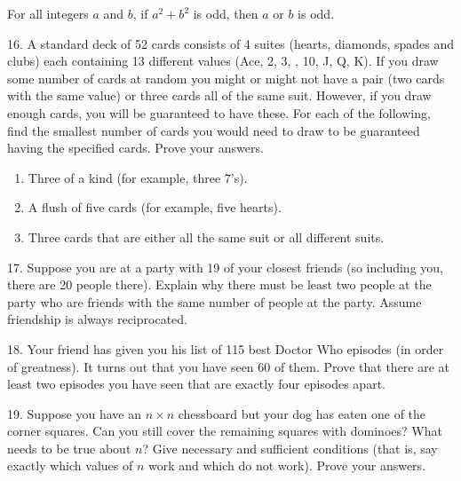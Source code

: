 \documentclass[12pt,]{book}
\theoremstyle{plain}
\theoremstyle{definition}
\theoremstyle{definition}
\theoremstyle{definition}
\numberwithin{equation}{chapter}
\begin{document}
\begin{exerciselist}
\begin{enumerate}[label=(\alph*)]
For all integers \(a\) and \(b\), if \(a^2 + b^2\) is odd, then \(a\) or \(b\) is odd.%
\end{enumerate}
%
\par\smallskip
\item[16.]\hypertarget{exercise-172}{}\hypertarget{p-1482}{}%
A standard deck of 52 cards consists of 4 suites (hearts, diamonds, spades and clubs) each containing 13 different values (Ace, 2, 3, \textellipsis{}, 10, J, Q, K). If you draw some number of cards at random you might or might not have a pair (two cards with the same value) or three cards all of the same suit. However, if you draw enough cards, you will be guaranteed to have these. For each of the following, find the smallest number of cards you would need to draw to be guaranteed having the specified cards. Prove your answers.%
\par
\hypertarget{p-1483}{}%
\leavevmode%
\begin{enumerate}[label=(\alph*)]
\item\hypertarget{li-692}{}\hypertarget{p-1484}{}%
Three of a kind (for example, three 7's). %
\item\hypertarget{li-693}{}\hypertarget{p-1485}{}%
A flush of five cards (for example, five hearts). %
\item\hypertarget{li-694}{}\hypertarget{p-1486}{}%
Three cards that are either all the same suit or all different suits. %
\end{enumerate}
%
\par\smallskip
\item[17.]\hypertarget{exercise-173}{}\hypertarget{p-1487}{}%
Suppose you are at a party with 19 of your closest friends (so including you, there are 20 people there). Explain why there must be least two people at the party who are friends with the same number of people at the party. Assume friendship is always reciprocated.%
\par\smallskip
\item[18.]\hypertarget{exercise-174}{}\hypertarget{p-1488}{}%
Your friend has given you his list of 115 best Doctor Who episodes (in order of greatness).  It turns out that you have seen 60 of them.  Prove that there are at least two episodes you have seen that are exactly four episodes apart.%
\par\smallskip
\item[19.]\hypertarget{exercise-175}{}\hypertarget{p-1489}{}%
Suppose you have an \(n\times n\) chessboard but your dog has eaten one of the corner squares. Can you still cover the remaining squares with dominoes? What needs to be true about \(n\)? Give necessary and sufficient conditions (that is, say exactly which values of \(n\) work and which do not work). Prove your answers.%

\end{exerciselist}
\end{document}
